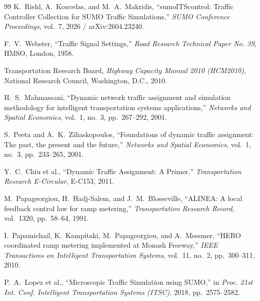 \documentclass[3p,times,procedia]{elsarticle}
\begin{document}
\begin{thebibliography}{99}
K.~Riehl, A.~Kouvelas, and M.~A.~Makridis, ``sumoITScontrol: Traffic Controller Collection for SUMO Traffic Simulations,'' \emph{SUMO Conference Proceedings}, vol.~7, 2026 / arXiv:2604.23240.

F.~V.~Webster, ``Traffic Signal Settings,'' \emph{Road Research Technical Paper No. 39}, HMSO, London, 1958.

Transportation Research Board, \emph{Highway Capacity Manual 2010 (HCM2010)}, National Research Council, Washington, D.C., 2010.

H.~S.~Mahmassani, ``Dynamic network traffic assignment and simulation methodology for intelligent transportation systems applications,'' \emph{Networks and Spatial Economics}, vol.~1, no.~3, pp.~267--292, 2001.

S.~Peeta and A.~K.~Ziliaskopoulos, ``Foundations of dynamic traffic assignment: The past, the present and the future,'' \emph{Networks and Spatial Economics}, vol.~1, no.~3, pp.~233--265, 2001.

Y.~C.~Chiu et al., ``Dynamic Traffic Assignment: A Primer,'' \emph{Transportation Research E-Circular}, E-C153, 2011.

M.~Papageorgiou, H.~Hadj-Salem, and J.~M.~Blosseville, ``ALINEA: A local feedback control law for ramp metering,'' \emph{Transportation Research Record}, vol.~1320, pp.~58--64, 1991.

I.~Papamichail, K.~Kampitaki, M.~Papageorgiou, and A.~Messmer, ``HERO coordinated ramp metering implemented at Monash Freeway,'' \emph{IEEE Transactions on Intelligent Transportation Systems}, vol.~11, no.~2, pp.~300--311, 2010.

P.~A.~Lopez et al., ``Microscopic Traffic Simulation using SUMO,'' in \emph{Proc. 21st Int. Conf. Intelligent Transportation Systems (ITSC)}, 2018, pp.~2575--2582.
\end{thebibliography}
\end{document}
